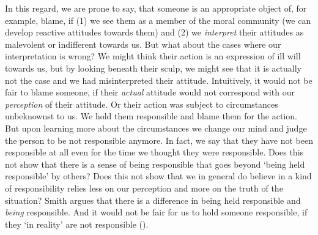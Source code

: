 \documentclass{article}
\newcounter{example}
\begin{document}
In this regard, we are prone to say, that someone is an
appropriate object of, for example, blame, if (1) we see them as a member of the moral
community (we can develop reactive attitudes towards them) and (2) we
\textit{interpret} their attitudes as malevolent or indifferent towards us. But what
about the cases where our interpretation is wrong? We might think their action
is an expression of ill will towards us, but by looking beneath their sculp, we
might see that it is actually not the case and we had misinterpreted their
attitude. Intuitively, it would not be fair to blame someone, if their
\textit{actual}
attitude would not correspond with our \textit{perception} of their attitude.
Or their action was subject to circumstances unbeknownst to us. We hold them
responsible and blame them for the action. But upon learning more about the
circumstances we change our mind and judge the person to be not responsible
anymore. In fact, we say that they have not been responsible at all even for the
time we thought they were responsible. Does this not show that there is a sense
of being responsible that goes beyond `being held responsible' by others? Does
this not show that we in general do believe in a kind of responsibility relies
less on our perception and more on the truth of the situation? 
Smith argues that there is a difference in being held responsible and 
\textit{being} responsible. And it would not be fair for us to hold someone
responsible, if they `in reality' are not responsible (\cite[p.
472]{Smith_2007}).\\




%
%
\end{document}
